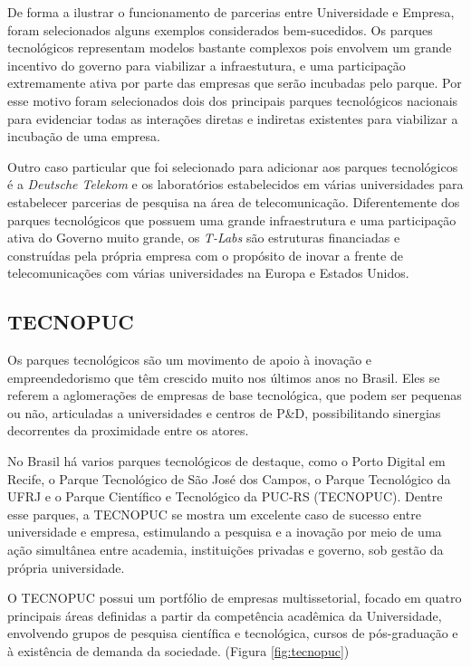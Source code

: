 De forma a ilustrar o funcionamento de parcerias entre Universidade e Empresa, foram selecionados alguns exemplos considerados bem-sucedidos. Os parques tecnológicos representam modelos bastante complexos pois envolvem um grande incentivo do governo para viabilizar a infraestutura, e uma participação extremamente ativa por parte das empresas que serão incubadas pelo parque. Por esse motivo foram selecionados dois dos principais parques tecnológicos nacionais para evidenciar todas as interações diretas e indiretas existentes para viabilizar a incubação de uma empresa.

Outro caso particular que foi selecionado para adicionar aos parques tecnológicos é a \textit{Deutsche Telekom} e os laboratórios estabelecidos em várias universidades para estabelecer parcerias de pesquisa na área de telecomunicação. Diferentemente dos parques tecnológicos que possuem uma grande infraestrutura e uma participação ativa do Governo muito grande, os \textit{T-Labs} são estruturas financiadas e construídas pela própria empresa com o propósito de inovar a frente de telecomunicações com várias universidades na Europa e Estados Unidos.

\subsection{TECNOPUC}

Os parques tecnológicos são um movimento de apoio à inovação e empreendedorismo que têm crescido muito nos últimos anos no Brasil. Eles se referem a aglomerações de empresas de base tecnológica, que podem ser pequenas ou não, articuladas a universidades e centros de P\&D, possibilitando sinergias decorrentes da proximidade entre os atores. \cite{parquestecnologicos} 

No Brasil há varios parques tecnológicos de destaque, como o Porto Digital em Recife, o Parque Tecnológico de São José dos Campos, o Parque Tecnológico da UFRJ e o Parque Científico e Tecnológico da PUC-RS (TECNOPUC). Dentre esse parques, a TECNOPUC se mostra um excelente caso de sucesso entre universidade e empresa, estimulando a pesquisa e a inovação por meio de uma ação simultânea entre academia, instituições privadas e governo, sob gestão da própria universidade.

O TECNOPUC possui um portfólio de empresas multissetorial, focado em quatro principais áreas definidas a partir da competência acadêmica da Universidade, envolvendo grupos de pesquisa científica e tecnológica, cursos de pós-graduação e à existência de demanda da sociedade. (Figura \ref{fig:tecnopuc})

